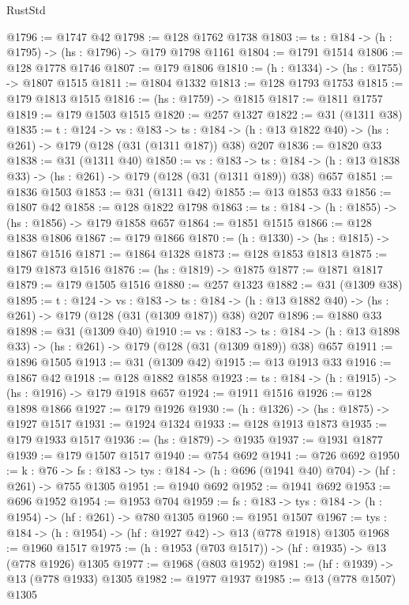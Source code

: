 \begin{lexlean}{RustStd}
\begin{coremodule}
@1796 := @1747 @42
@1798 := @128 @1762 @1738
@1803 := {ts : @184} -> (h : @1795) -> (hs : @1796) -> @179 @1798 @1161
@1804 := @1791 @1514
@1806 := @128 @1778 @1746
@1807 := @179 @1806
@1810 := (h : @1334) -> (hs : @1755) -> @1807 @1515
@1811 := @1804 @1332
@1813 := @128 @1793 @1753
@1815 := @179 @1813 @1515
@1816 := (hs : @1759) -> @1815
@1817 := @1811 @1757
@1819 := @179 @1503 @1515
@1820 := @257 @1327
@1822 := @31 (@1311 @38)
@1835 := {t : @124} ->
  {vs : @183} ->
  {ts : @184} -> (h : @13 @1822 @40) -> (hs : @261) -> @179 (@128 (@31 (@1311 @187)) @38) @207
@1836 := @1820 @33
@1838 := @31 (@1311 @40)
@1850 := {vs : @183} ->
  {ts : @184} -> (h : @13 @1838 @33) -> (hs : @261) -> @179 (@128 (@31 (@1311 @189)) @38) @657
@1851 := @1836 @1503
@1853 := @31 (@1311 @42)
@1855 := @13 @1853 @33
@1856 := @1807 @42
@1858 := @128 @1822 @1798
@1863 := {ts : @184} -> (h : @1855) -> (hs : @1856) -> @179 @1858 @657
@1864 := @1851 @1515
@1866 := @128 @1838 @1806
@1867 := @179 @1866
@1870 := (h : @1330) -> (hs : @1815) -> @1867 @1516
@1871 := @1864 @1328
@1873 := @128 @1853 @1813
@1875 := @179 @1873 @1516
@1876 := (hs : @1819) -> @1875
@1877 := @1871 @1817
@1879 := @179 @1505 @1516
@1880 := @257 @1323
@1882 := @31 (@1309 @38)
@1895 := {t : @124} ->
  {vs : @183} ->
  {ts : @184} -> (h : @13 @1882 @40) -> (hs : @261) -> @179 (@128 (@31 (@1309 @187)) @38) @207
@1896 := @1880 @33
@1898 := @31 (@1309 @40)
@1910 := {vs : @183} ->
  {ts : @184} -> (h : @13 @1898 @33) -> (hs : @261) -> @179 (@128 (@31 (@1309 @189)) @38) @657
@1911 := @1896 @1505
@1913 := @31 (@1309 @42)
@1915 := @13 @1913 @33
@1916 := @1867 @42
@1918 := @128 @1882 @1858
@1923 := {ts : @184} -> (h : @1915) -> (hs : @1916) -> @179 @1918 @657
@1924 := @1911 @1516
@1926 := @128 @1898 @1866
@1927 := @179 @1926
@1930 := (h : @1326) -> (hs : @1875) -> @1927 @1517
@1931 := @1924 @1324
@1933 := @128 @1913 @1873
@1935 := @179 @1933 @1517
@1936 := (hs : @1879) -> @1935
@1937 := @1931 @1877
@1939 := @179 @1507 @1517
@1940 := @754 @692
@1941 := @726 @692
@1950 := {k : @76} ->
  {fs : @183} -> {tys : @184} -> (h : @696 (@1941 @40) @704) -> (hf : @261) -> @755 @1305
@1951 := @1940 @692
@1952 := @1941 @692
@1953 := @696 @1952
@1954 := @1953 @704
@1959 := {fs : @183} -> {tys : @184} -> (h : @1954) -> (hf : @261) -> @780 @1305
@1960 := @1951 @1507
@1967 := {tys : @184} -> (h : @1954) -> (hf : @1927 @42) -> @13 (@778 @1918) @1305
@1968 := @1960 @1517
@1975 := (h : @1953 (@703 @1517)) -> (hf : @1935) -> @13 (@778 @1926) @1305
@1977 := @1968 (@803 @1952)
@1981 := (hf : @1939) -> @13 (@778 @1933) @1305
@1982 := @1977 @1937
@1985 := @13 (@778 @1507) @1305

\end{coremodule}
\end{lexlean}
